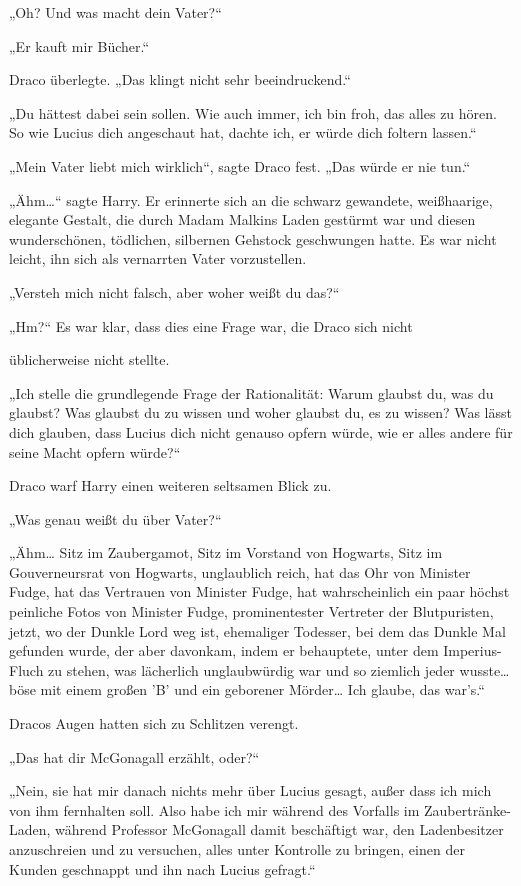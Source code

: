 {„Oh? Und was macht dein Vater?“

„Er kauft mir Bücher.“

Draco überlegte. „Das klingt nicht sehr beeindruckend.“

„Du hättest dabei sein sollen. Wie auch immer, ich bin froh, das alles zu hören. So wie Lucius dich angeschaut hat, dachte ich, er würde dich foltern lassen.“

„Mein Vater liebt mich wirklich“, sagte Draco fest. „Das würde er nie tun.“

„Ähm…“ sagte Harry. Er erinnerte sich an die schwarz gewandete, weißhaarige, elegante Gestalt, die durch Madam Malkins Laden gestürmt war und diesen wunderschönen, tödlichen, silbernen Gehstock geschwungen hatte. Es war nicht leicht, ihn sich als vernarrten Vater vorzustellen.

„Versteh mich nicht falsch, aber woher weißt du das?“

„Hm?“ Es war klar, dass dies eine Frage war, die Draco sich nicht

üblicherweise nicht stellte.

„Ich stelle die grundlegende Frage der Rationalität: Warum glaubst du, was du glaubst? Was glaubst du zu wissen und woher glaubst du, es zu wissen? Was lässt dich glauben, dass Lucius dich nicht genauso opfern würde, wie er alles andere für seine Macht opfern würde?“

Draco warf Harry einen weiteren seltsamen Blick zu.

„Was genau weißt du über Vater?“

„Ähm… Sitz im Zaubergamot, Sitz im Vorstand von Hogwarts, Sitz im Gouverneursrat von Hogwarts, unglaublich reich, hat das Ohr von Minister Fudge, hat das Vertrauen von Minister Fudge, hat wahrscheinlich ein paar höchst peinliche Fotos von Minister Fudge, prominentester Vertreter der Blutpuristen, jetzt, wo der Dunkle Lord weg ist, ehemaliger Todesser, bei dem das Dunkle Mal gefunden wurde, der aber davonkam, indem er behauptete, unter dem Imperius-Fluch zu stehen, was lächerlich unglaubwürdig war und so ziemlich jeder wusste… böse mit einem großen 'B' und ein geborener Mörder… Ich glaube, das war's.“

Dracos Augen hatten sich zu Schlitzen verengt.

„Das hat dir McGonagall erzählt, oder?“

„Nein, sie hat mir danach nichts mehr über Lucius gesagt, außer dass ich mich von ihm fernhalten soll. Also habe ich mir während des Vorfalls im Zaubertränke-Laden, während Professor McGonagall damit beschäftigt war, den Ladenbesitzer anzuschreien und zu versuchen, alles unter Kontrolle zu bringen, einen der Kunden geschnappt und ihn nach Lucius gefragt.“

}
